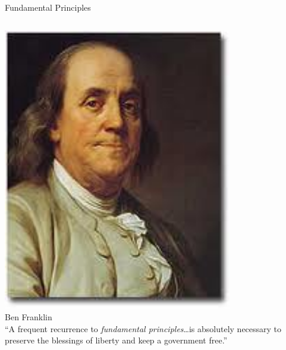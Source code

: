 \begin{frame}{Fundamental Principles}
    \begin{columns}[onlytextwidth]
            \centering
            \includegraphics[width=0.75\textwidth]{img/ben-franklin.png} \\
            Ben Franklin \\

            ``A frequent recurrence to \emph{fundamental principles}\ldots is absolutely necessary to preserve the blessings of liberty and keep a government free.''
    \end{columns}
\end{frame}

